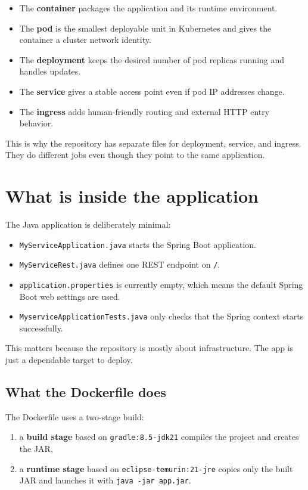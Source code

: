 \documentclass[11pt,a4paper]{article}
\newcommand{\pathitem}[1]{\texorpdfstring{\nolinkurl{#1}}{#1}}
\newcommand{\cmd}[1]{\texttt{#1}}
\begin{document}
\begin{itemize}
\item The \textbf{container} packages the application and its runtime environment.
\item The \textbf{pod} is the smallest deployable unit in Kubernetes and gives the container a cluster network identity.
\item The \textbf{deployment} keeps the desired number of pod replicas running and handles updates.
\item The \textbf{service} gives a stable access point even if pod IP addresses change.
\item The \textbf{ingress} adds human-friendly routing and external HTTP entry behavior.
\end{itemize}

This is why the repository has separate files for deployment, service, and ingress. They do different jobs even though they point to the same application.

\section{What is inside the application}

The Java application is deliberately minimal:

\begin{itemize}
\item \pathitem{MyServiceApplication.java} starts the Spring Boot application.
\item \pathitem{MyServiceRest.java} defines one REST endpoint on \cmd{/}.
\item \pathitem{application.properties} is currently empty, which means the default Spring Boot web settings are used.
\item \pathitem{MyserviceApplicationTests.java} only checks that the Spring context starts successfully.
\end{itemize}

This matters because the repository is mostly about infrastructure. The app is just a dependable target to deploy.

\subsection{What the Dockerfile does}

The Dockerfile uses a two-stage build:

\begin{enumerate}
\item a \textbf{build stage} based on \cmd{gradle:8.5-jdk21} compiles the project and creates the JAR,
\item a \textbf{runtime stage} based on \cmd{eclipse-temurin:21-jre} copies only the built JAR and launches it with \cmd{java -jar app.jar}.
\end{enumerate}
\end{document}
